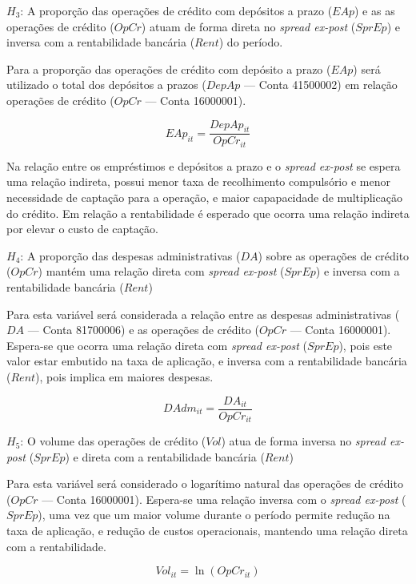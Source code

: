 \documentclass[
  12pt,
  12pt,
  openright,
  oneside,
  a4paper,
  chapter=TITLE,
  section=TITLE,
  subsection=TITLE,
  subsubsection=TITLE,
  english,
  portugues,
  sumario=tradicional]{abntex2}
\begin{document}
\(H_{3}\): A proporção das operações de crédito com depósitos a prazo (\(EAp\)) e as as operações de crédito (\(OpCr\)) atuam de forma direta no \emph{spread ex-post} (\(SprEp\)) e inversa com a rentabilidade bancária (\(Rent\)) do período.

Para a proporção das operações de crédito com depósito a prazo (\(EAp\)) será utilizado o total dos depósitos a prazos (\(DepAp\) --- Conta 41500002) em relação operações de crédito (\(OpCr\) --- Conta 16000001).

\begin{equation}
EAp_{it} = \frac{DepAp_{it}}{OpCr_{it}}
\end{equation}

Na relação entre os empréstimos e depósitos a prazo e o \emph{spread ex-post} se espera uma relação indireta, possui menor taxa de recolhimento compulsório e menor necessidade de captação para a operação, e maior capapacidade de multiplicação do crédito. Em relação a rentabilidade é esperado que ocorra uma relação indireta por elevar o custo de captação.

\(H_{4}\): A proporção das despesas administrativas (\(DA\)) sobre as operações de crédito (\(OpCr\)) mantém uma relação direta com \emph{spread ex-post} (\(SprEp\)) e inversa com a rentabilidade bancária (\(Rent\))

Para esta variável será considerada a relação entre as despesas administrativas (\(DA\) --- Conta 81700006) e as operações de crédito (\(OpCr\) --- Conta 16000001). Espera-se que ocorra uma relação direta com \emph{spread ex-post} (\(SprEp\)), pois este valor estar embutido na taxa de aplicação, e inversa com a rentabilidade bancária (\(Rent\)), pois implica em maiores despesas.

\begin{equation}
DAdm_{it} = \frac{DA_{it}}{OpCr_{it}}
\end{equation}

\(H_{5}\): O volume das operações de crédito (\(Vol\)) atua de forma inversa no \emph{spread ex-post} (\(SprEp\)) e direta com a rentabilidade bancária (\(Rent\))

Para esta variável será considerado o logarítimo natural das operações de crédito (\(OpCr\) --- Conta 16000001). Espera-se uma relação inversa com o \emph{spread ex-post} (\(SprEp\)), uma vez que um maior volume durante o período permite redução na taxa de aplicação, e redução de custos operacionais, mantendo uma relação direta com a rentabilidade.

\begin{equation}
Vol_{it} = \ln(OpCr_{it})
\end{equation}
\end{document}
